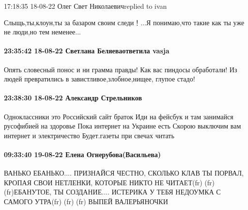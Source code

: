  
 
 
 
 

17:18:35 18-08-22
Олег Свет Николаевичreplied to ivan

Слыщь,ты,клоун,ты за базаром своим следи！...Я понимаю,что такие как ты уже не люди,но тем неменее...

\paragraph{23:35:42 18-08-22 Светлана Беляеваответила vasja}

Опять словесный понос и ни грамма правды! Как вас пиндосы обработали! Из людей
превратились в завистливое,злобное,нищее, глупое стадо!

\paragraph{23:38:30 18-08-22 Александр Стрельников}

Одноклассники это Российский сайт браток Иди на фейсбук и там занимайся
русофибией на здоровье Пока интернет на Украине есть Скорою выключим вам
интернет и электричество Будет.газеты при свечах читать

\paragraph{09:33:40 19-08-22 Елена Огнерубова(Васильева)}

ВАНЬКО ЕБАНЬКО.... ПРИЗНАЙСЯ ЧЕСТНО, СКОЛЬКО КЛАВ ТЫ ПОРВАЛ, КРОПАЯ СВОИ
НЕТЛЕНКИ, КОТОРЫЕ НИКТО НЕ ЧИТАЕТ(fr) (fr) (fr)ЕБАНУТОЕ, ТЫ СОЗДАНИЕ....
ИСТЕРИКА У ТЕБЯ НЕДОУМКА С САМОГО УТРА(fr) (fr) (fr) ВЫПЕЙ ВАЛЕРЬЯНОЧКИ
